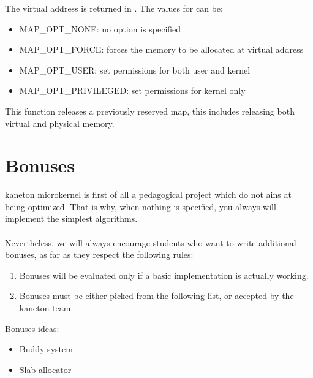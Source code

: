 \begin{itemize}
{	   The virtual address is returned in . The
	   values for  can be:
	   \begin{itemize}
	     \item {MAP\_OPT\_NONE}: no option is specified
	     \item {MAP\_OPT\_FORCE}: forces the memory to be allocated at virtual address 
	     \item {MAP\_OPT\_USER}: set permissions for both user and kernel
	     \item {MAP\_OPT\_PRIVILEGED}: set permissions for kernel only
	   \end{itemize}
	 }

	 {
	   This function releases a previously reserved map, this
	   includes releasing both virtual and physical memory.
	 }
\end{itemize}

%
%

\newpage

\section{Bonuses}

kaneton microkernel is first of all a pedagogical project which do not ains at being
optimized. That is why, when nothing is specified, you always will implement the simplest
algorithms.\\
\\
Nevertheless, we will always encourage students who want to write additional bonuses, as far as they respect the following rules:
\begin{enumerate}
  \item Bonuses will be evaluated only if a basic implementation is actually working.
  \item Bonuses must be either picked from the following list, or accepted by the kaneton team.\\
\end{enumerate}

Bonuses ideas:
\begin{itemize}
\item Buddy system
\item Slab allocator
\end{itemize}
